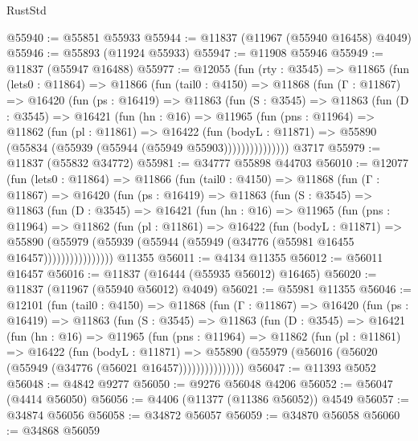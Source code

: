 \begin{lexlean}{RustStd}
\begin{coremodule}
@55940 := @55851 @55933
@55944 := @11837 (@11967 (@55940 @16458) @4049)
@55946 := @55893 (@11924 @55933)
@55947 := @11908 @55946
@55949 := @11837 (@55947 @16488)
@55977 := @12055
    (fun (rty : @3545) =>
    @11865
      (fun (lets0 : @11864) =>
      @11866
        (fun (tail0 : @4150) =>
        @11868
          (fun (Γ : @11867) =>
          @16420
            (fun (ps : @16419) =>
            @11863
              (fun (S : @3545) =>
              @11863
                (fun (D : @3545) =>
                @16421
                  (fun (hn : @16) =>
                  @11965
                    (fun (pns : @11964) =>
                    @11862
                      (fun (pl : @11861) =>
                      @16422
                        (fun (bodyL : @11871) =>
                        @55890 (@55834 (@55939 (@55944 (@55949 @55903)))))))))))))))
    @3717
@55979 := @11837 (@55832 @34772)
@55981 := @34777 @55898 @44703
@56010 := @12077
    (fun (lets0 : @11864) =>
    @11866
      (fun (tail0 : @4150) =>
      @11868
        (fun (Γ : @11867) =>
        @16420
          (fun (ps : @16419) =>
          @11863
            (fun (S : @3545) =>
            @11863
              (fun (D : @3545) =>
              @16421
                (fun (hn : @16) =>
                @11965
                  (fun (pns : @11964) =>
                  @11862
                    (fun (pl : @11861) =>
                    @16422
                      (fun (bodyL : @11871) =>
                      @55890
                        (@55979
                          (@55939 (@55944 (@55949 (@34776 (@55981 @16455 @16457))))))))))))))))
    @11355
@56011 := @4134 @11355
@56012 := @56011 @16457
@56016 := @11837 (@16444 (@55935 @56012) @16465)
@56020 := @11837 (@11967 (@55940 @56012) @4049)
@56021 := @55981 @11355
@56046 := @12101
    (fun (tail0 : @4150) =>
    @11868
      (fun (Γ : @11867) =>
      @16420
        (fun (ps : @16419) =>
        @11863
          (fun (S : @3545) =>
          @11863
            (fun (D : @3545) =>
            @16421
              (fun (hn : @16) =>
              @11965
                (fun (pns : @11964) =>
                @11862
                  (fun (pl : @11861) =>
                  @16422
                    (fun (bodyL : @11871) =>
                    @55890 (@55979 (@56016 (@56020 (@55949 (@34776 (@56021 @16457)))))))))))))))
@56047 := @11393 @5052
@56048 := @4842 @9277
@56050 := @9276 @56048 @4206
@56052 := @56047 (@4414 @56050)
@56056 := @4406 (@11377 (@11386 @56052)) @4549
@56057 := @34874 @56056
@56058 := @34872 @56057
@56059 := @34870 @56058
@56060 := @34868 @56059

\end{coremodule}
\end{lexlean}
